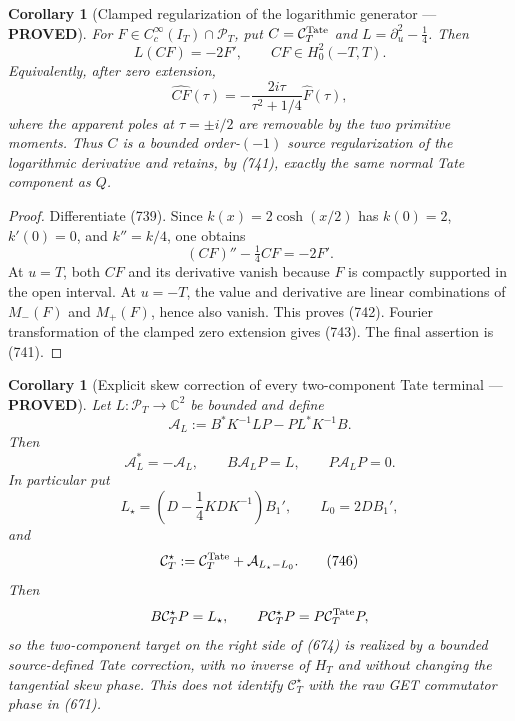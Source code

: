 \documentclass[11pt]{article}
\newtheorem{corollary}[theorem]{Corollary}
\newcommand{\PROVED}{\textcolor{green!45!black}{\textbf{PROVED}}}
\begin{document}
\begin{corollary}[Clamped regularization of the logarithmic generator ---
\PROVED]
For \(F\in C_c^\infty(I_T)\cap\mathcal P_T\), put
\(C=\mathcal C_T^{\rm Tate}\) and
\(L=\partial_u^2-\frac14\).  Then
\begin{equation}
 \boxed{L(CF)=-2F',\qquad CF\in H_0^2(-T,T).}        \tag{742}
\end{equation}
Equivalently, after zero extension,
\begin{equation}
 \widehat{CF}(\tau)
 =-\frac{2i\tau}{\tau^2+1/4}\widehat F(\tau),        \tag{743}
\end{equation}
where the apparent poles at \(\tau=\pm i/2\) are removable by the two
primitive moments.  Thus \(C\) is a bounded order-\((-1)\) source
regularization of the logarithmic derivative and retains, by (741),
exactly the same normal Tate component as \(Q\).
\end{corollary}

\begin{proof}
Differentiate (739).  Since
\(k(x)=2\cosh(x/2)\) has \(k(0)=2\), \(k'(0)=0\), and
\(k''=k/4\), one obtains
\[
 (CF)''-\tfrac14CF=-2F'.
\]
At \(u=T\), both \(CF\) and its derivative vanish because \(F\) is compactly
supported in the open interval.  At \(u=-T\), the value and derivative are
linear combinations of \(M_-(F)\) and \(M_+(F)\), hence also vanish.
This proves (742).  Fourier transformation of the clamped zero extension
gives (743).  The final assertion is (741).
\end{proof}

\begin{corollary}[Explicit skew correction of every two-component Tate
terminal --- \PROVED]
Let \(L:\mathcal P_T\to\mathbb C^2\) be bounded and define
\begin{equation}
 \mathcal A_L
 :=B^*K^{-1}LP-PL^*K^{-1}B.                         \tag{744}
\end{equation}
Then
\begin{equation}
 \mathcal A_L^*=-\mathcal A_L,\qquad
 B\mathcal A_LP=L,\qquad
 P\mathcal A_LP=0.                                  \tag{745}
\end{equation}
In particular put
\[
 L_\star=\left(D-\frac14KDK^{-1}\right)B_1',
 \qquad L_0=2DB_1',
\]
and
\begin{equation}
 \mathcal C_T^\star
 :=\mathcal C_T^{\rm Tate}+\mathcal A_{L_\star-L_0}. \tag{746}
\end{equation}
Then
\[
 B\mathcal C_T^\star P=L_\star,\qquad
 P\mathcal C_T^\star P=P\mathcal C_T^{\rm Tate}P,
\]
so the two-component target on the right side of (674) is realized by a
bounded source-defined Tate correction, with no inverse of \(H_T\) and
without changing the tangential skew phase.  This does not identify
\(\mathcal C_T^\star\) with the raw GET commutator phase in (671).
\end{corollary}
\end{document}
